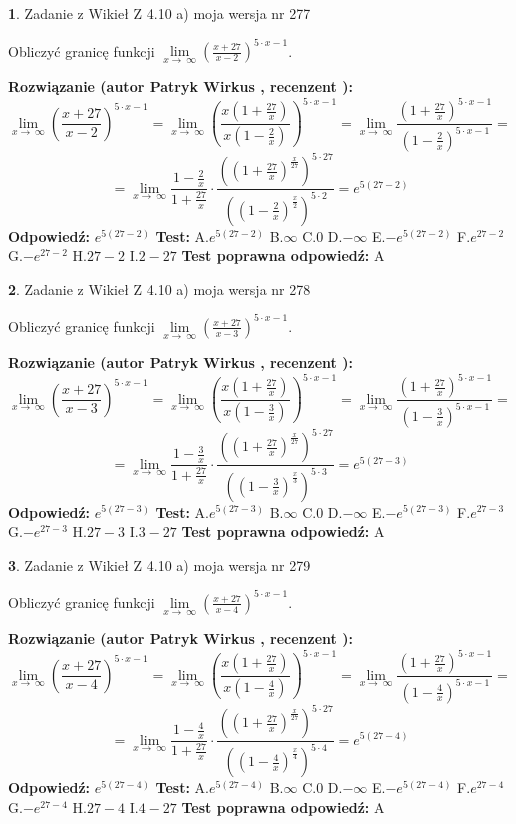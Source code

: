 \documentclass[12pt, a4paper]{article}
\theoremstyle{definition} %
\newtheorem{zad}{}
\newcommand{\zadStart}[1]{\begin{zad}#1\newline}
\newcommand{\zadStop}{\end{zad}}
\newcommand{\rozwStart}[2]{\noindent \textbf{Rozwiązanie (autor #1 , recenzent #2): }\newline}
\newcommand{\rozwStop}{\newline}
\newcommand{\odpStart}{\noindent \textbf{Odpowiedź:}\newline}
\newcommand{\odpStop}{\newline}
\newcommand{\testStart}{\noindent \textbf{Test:}\newline}
\newcommand{\testStop}{\newline}
\newcommand{\kluczStart}{\noindent \textbf{Test poprawna odpowiedź:}\newline}
\newcommand{\kluczStop}{\newline}
\begin{document}
\zadStart{Zadanie z Wikieł Z 4.10 a) moja wersja nr 277}


Obliczyć granicę funkcji  $\lim\limits_{x\to\ \infty}(\frac{x+27}{x-2})^{5\cdot x-1}$.
\zadStop
\rozwStart{Patryk Wirkus}{}
$$\lim\limits_{x\to\ \infty}(\frac{x+27}{x-2})^{5\cdot x-1} = \lim\limits_{x\to\ \infty}(\frac{x(1+\frac{27}{x})}{x(1-\frac{2}{x})})^{5\cdot x-1}=\lim\limits_{x\to\ \infty}\frac{(1+\frac{27}{x})^{5\cdot x-1}}{(1-\frac{2}{x})^{5\cdot x-1}}=$$
$$=\lim\limits_{x\to\ \infty}\frac{1-\frac{2}{x}}{1+\frac{27}{x}}\cdot\frac{((1+\frac{27}{x})^{\frac{x}{27}})^{5\cdot27}}{((1-\frac{2}{x})^{\frac{x}{2}})^{5\cdot2}}=e^{5(27-2)}$$
\rozwStop
\odpStart
$e^{5(27-2)}$
\odpStop
\testStart
A.$e^{5(27-2)}$ B.$\infty$ C.$0$ D.$-\infty$ E.$-e^{5(27-2)}$
F.$e^{27-2}$ G.$-e^{27-2}$
H.$27-2$
I.$2-27$
\testStop
\kluczStart
A
\kluczStop



\zadStart{Zadanie z Wikieł Z 4.10 a) moja wersja nr 278}


Obliczyć granicę funkcji  $\lim\limits_{x\to\ \infty}(\frac{x+27}{x-3})^{5\cdot x-1}$.
\zadStop
\rozwStart{Patryk Wirkus}{}
$$\lim\limits_{x\to\ \infty}(\frac{x+27}{x-3})^{5\cdot x-1} = \lim\limits_{x\to\ \infty}(\frac{x(1+\frac{27}{x})}{x(1-\frac{3}{x})})^{5\cdot x-1}=\lim\limits_{x\to\ \infty}\frac{(1+\frac{27}{x})^{5\cdot x-1}}{(1-\frac{3}{x})^{5\cdot x-1}}=$$
$$=\lim\limits_{x\to\ \infty}\frac{1-\frac{3}{x}}{1+\frac{27}{x}}\cdot\frac{((1+\frac{27}{x})^{\frac{x}{27}})^{5\cdot27}}{((1-\frac{3}{x})^{\frac{x}{3}})^{5\cdot3}}=e^{5(27-3)}$$
\rozwStop
\odpStart
$e^{5(27-3)}$
\odpStop
\testStart
A.$e^{5(27-3)}$ B.$\infty$ C.$0$ D.$-\infty$ E.$-e^{5(27-3)}$
F.$e^{27-3}$ G.$-e^{27-3}$
H.$27-3$
I.$3-27$
\testStop
\kluczStart
A
\kluczStop



\zadStart{Zadanie z Wikieł Z 4.10 a) moja wersja nr 279}


Obliczyć granicę funkcji  $\lim\limits_{x\to\ \infty}(\frac{x+27}{x-4})^{5\cdot x-1}$.
\zadStop
\rozwStart{Patryk Wirkus}{}
$$\lim\limits_{x\to\ \infty}(\frac{x+27}{x-4})^{5\cdot x-1} = \lim\limits_{x\to\ \infty}(\frac{x(1+\frac{27}{x})}{x(1-\frac{4}{x})})^{5\cdot x-1}=\lim\limits_{x\to\ \infty}\frac{(1+\frac{27}{x})^{5\cdot x-1}}{(1-\frac{4}{x})^{5\cdot x-1}}=$$
$$=\lim\limits_{x\to\ \infty}\frac{1-\frac{4}{x}}{1+\frac{27}{x}}\cdot\frac{((1+\frac{27}{x})^{\frac{x}{27}})^{5\cdot27}}{((1-\frac{4}{x})^{\frac{x}{4}})^{5\cdot4}}=e^{5(27-4)}$$
\rozwStop
\odpStart
$e^{5(27-4)}$
\odpStop
\testStart
A.$e^{5(27-4)}$ B.$\infty$ C.$0$ D.$-\infty$ E.$-e^{5(27-4)}$
F.$e^{27-4}$ G.$-e^{27-4}$
H.$27-4$
I.$4-27$
\testStop
\kluczStart
A
\kluczStop
\end{document}
